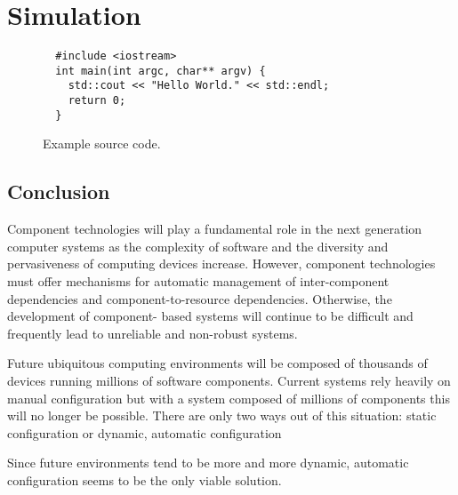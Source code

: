 \chapter{Simulation}

\begin{figure}
  \begin{verbatim}
  #include <iostream>
  int main(int argc, char** argv) {
    std::cout << "Hello World." << std::endl;
    return 0;
  }
  \end{verbatim}
  \caption{Example source code.}
  \label{fig:sourcecode}
\end{figure}

\section{Conclusion}

Component technologies will play a fundamental role in the next generation
computer systems as the complexity of software and the diversity and
pervasiveness of computing devices increase. However, component technologies
must offer mechanisms for automatic management of inter-component dependencies
and component-to-resource dependencies. Otherwise, the development of
component- based systems will continue to be difficult and frequently lead to
unreliable and non-robust systems.  

Future ubiquitous computing environments will be composed of thousands of
devices running millions of software components. Current systems rely heavily
on manual configuration but with a system composed of millions of components
this will no longer be possible.  There are only two ways out of this
situation: static configuration or dynamic, automatic configuration

Since future environments tend to be more and more dynamic, automatic
configuration seems to be the only viable solution.
